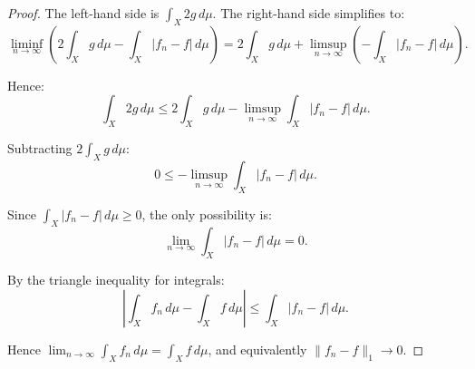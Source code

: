 \begin{proof}
    The left-hand side is $\int_X 2g\,d\mu$. The right-hand side simplifies to:
    $$\liminf_{n \to \infty} \left(2\int_X g\,d\mu - \int_X |f_n - f|\,d\mu\right) = 2\int_X g\,d\mu + \limsup_{n \to \infty} \left(-\int_X |f_n - f|\,d\mu\right).$$

    Hence:
    $$\int_X 2g\,d\mu \leq 2\int_X g\,d\mu - \limsup_{n \to \infty} \int_X |f_n - f|\,d\mu.$$

    Subtracting $2\int_X g\,d\mu$:
    $$0 \leq -\limsup_{n \to \infty} \int_X |f_n - f|\,d\mu.$$

    Since $\int_X |f_n - f|\,d\mu \geq 0$, the only possibility is:
    $$\lim_{n \to \infty} \int_X |f_n - f|\,d\mu = 0.$$

    By the triangle inequality for integrals:
    $$\left|\int_X f_n\,d\mu - \int_X f\,d\mu\right| \leq \int_X |f_n - f|\,d\mu.$$

    Hence $\lim_{n \to \infty} \int_X f_n\,d\mu = \int_X f\,d\mu$, and equivalently $\|f_n - f\|_1 \to 0$.
\end{proof}
